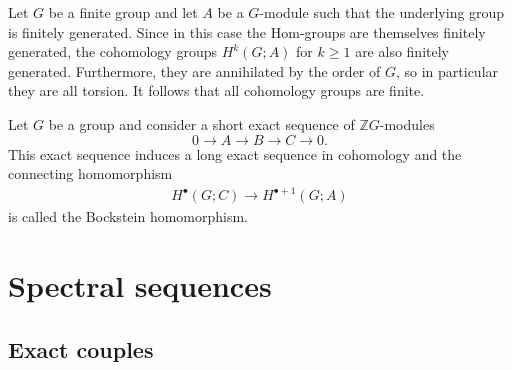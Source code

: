 	\begin{property}[Finiteness]
		Let $G$ be a finite group and let $A$ be a $G$-module such that the underlying group is finitely generated. Since in this case the Hom-groups are themselves finitely generated, the cohomology groups $H^k(G; A)$ for $k\geq1$ are also finitely generated. Furthermore, they are annihilated by the order of $G$, so in particular they are all torsion. It follows that all cohomology groups are finite.
	\end{property}

    \begin{property}
        Let $G$ be a group and consider a short exact sequence of $\mathbb{Z}G$-modules \[0\longrightarrow A\longrightarrow B\longrightarrow C\longrightarrow0.\] This exact sequence induces a long exact sequence in cohomology and the connecting homomorphism
        \begin{gather}
            H^\bullet(G;C)\rightarrow H^{\bullet+1}(G;A)
        \end{gather}
        is called the Bockstein homomorphism.
    \end{property}

\section{Spectral sequences}



\subsection{Exact couples}


